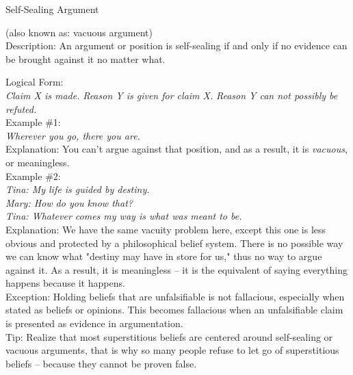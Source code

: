 \documentclass[a4paper,12pt,single,pdftex]{scrartcl}
\begin{document}
  

Self-Sealing Argument
    
      (also known as: vacuous argument)
    \\

  
    Description: An argument or position is self-sealing if and only if no evidence can be brought against it no matter what.

    
      Logical Form:
    \\

    
      {\em Claim X is made.} \newline
{\em Reason Y is given for claim X.} \newline
{\em Reason Y can not possibly be refuted.}
    \\

    
      Example \#1:
    \\

    
      {\em Wherever you go, there you are.}
    \\

    
      Explanation: You can’t argue against that position, and as a result, it is {\it vacuous}, or meaningless. 
    \\

    
      Example \#2:
    \\

    
      {\em Tina: My life is guided by destiny.}
    \\

    
      {\em Mary: How do you know that?}
    \\

    
      {\em Tina: Whatever comes my way is what was meant to be.}
    \\

    
      Explanation: We have the same vacuity problem here, except this one is less obvious and protected by a philosophical belief system.  There is no possible way we can know what "destiny may have in store for us," thus no way to argue against it.  As a result, it is meaningless -- it is the equivalent of saying everything happens because it happens.
    \\

    
      Exception: Holding beliefs that are unfalsifiable is not fallacious, especially when stated as beliefs or opinions. This becomes fallacious when an unfalsifiable claim is presented as evidence in argumentation.
    \\

    
      Tip: Realize that most superstitious beliefs are centered around self-sealing or vacuous arguments, that is why so many people refuse to let go of superstitious beliefs -- because they cannot be proven false.
    \\
\end{document}
